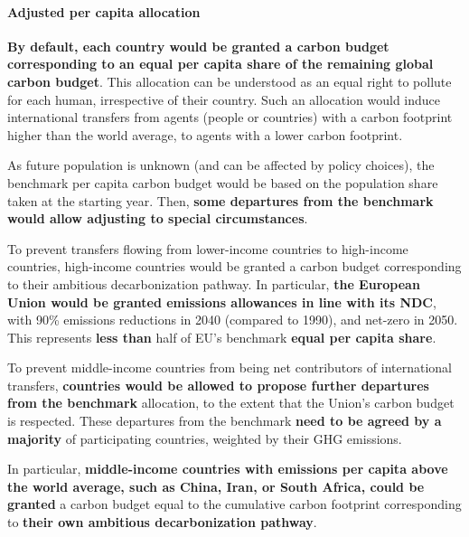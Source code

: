 \documentclass[12pt,english]{article}
\begin{document}
\paragraph{Adjusted per capita allocation}
\textbf{By default, each country would be granted a carbon budget corresponding to an equal per capita share of the remaining global carbon budget}. This allocation can be understood as an equal right to pollute for each human, irrespective of their country. Such an allocation would induce international transfers from agents (people or countries) with a carbon footprint higher than the world average, to agents with a lower carbon footprint.

As future population is unknown (and can be affected by policy choices), the benchmark per capita carbon budget would be based on the population share taken at the starting year. %
Then, \textbf{some departures from the benchmark would allow adjusting to special circumstances}.

To prevent transfers flowing from lower-income countries to high-income countries, high-income countries would be granted a carbon budget corresponding to their ambitious decarbonization pathway. In particular, \textbf{the European Union would be granted emissions allowances in line with its NDC}, with 90\% emissions reductions in 2040 (compared to 1990), and net-zero in 2050. This represents \textbf{less than} half of EU's benchmark \textbf{equal per capita share}.

To prevent middle-income countries from being net contributors of international transfers, \textbf{countries would be allowed to propose further departures from the benchmark} allocation, to the extent that the Union's carbon budget is respected. These departures from the benchmark \textbf{need to be agreed by a majority} of participating countries, weighted by their GHG emissions. %

In particular, \textbf{middle-income countries with emissions per capita above the world average, such as China, Iran, or South Africa, could be granted} a carbon budget equal to the cumulative carbon footprint corresponding to \textbf{their own ambitious decarbonization pathway}.
\end{document}
